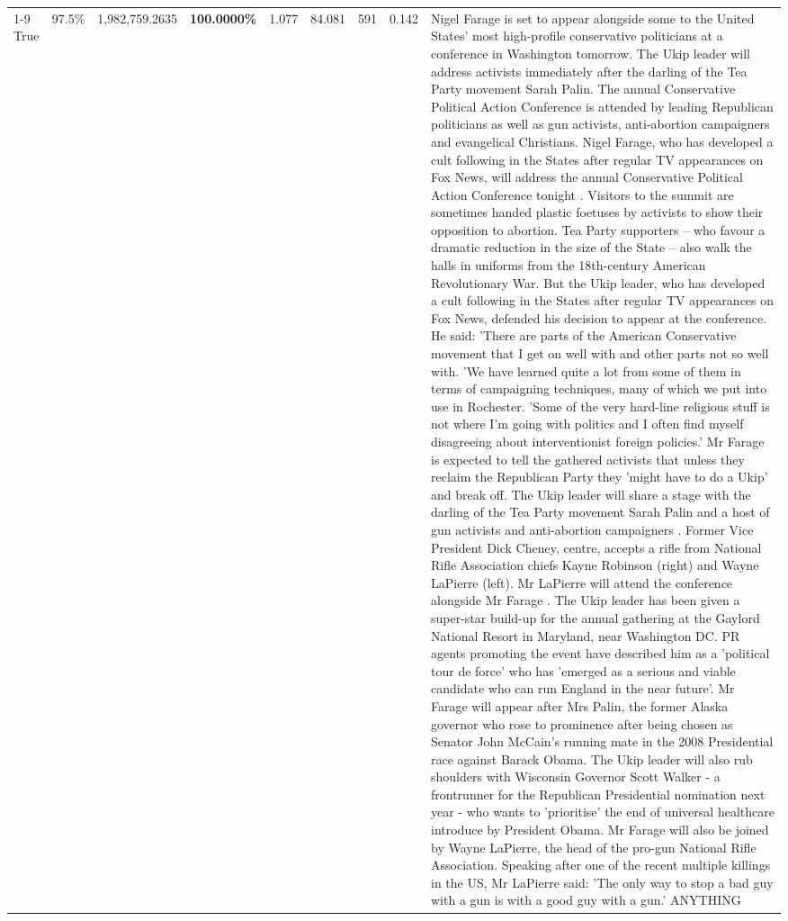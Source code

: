 \begin{table}[H]
\begin{tabular}{lllrlllll}
\cline{1-9} \cline{2-9}
True & 97.5\% & 1,982,759.2635 & \bfseries \color{red} 100.0000\% & 1.077 & 84.081 & 591 & 0.142 & Nigel Farage is set to appear alongside some to the United States' most high-profile conservative politicians at a conference in Washington tomorrow. The Ukip leader will address activists immediately after the darling of the Tea Party movement Sarah Palin. The annual Conservative Political Action Conference is attended by leading Republican politicians as well as gun activists, anti-abortion campaigners and evangelical Christians. Nigel Farage, who has developed a cult following in the States after regular TV appearances on Fox News, will address the annual Conservative Political Action Conference tonight . Visitors to the summit are sometimes handed plastic foetuses by activists to show their opposition to abortion. Tea Party supporters – who favour a dramatic reduction in the size of the State – also walk the halls in uniforms from the 18th-century American Revolutionary War. But the Ukip leader, who has developed a cult following in the States after regular TV appearances on Fox News, defended his decision to appear at the conference. He said: 'There are parts of the American Conservative movement that I get on well with and other parts not so well with. 'We have learned quite a lot from some of them in terms of campaigning techniques, many of which we put into use in Rochester. 'Some of the very hard-line religious stuff is not where I'm going with politics and I often find myself disagreeing about interventionist foreign policies.' Mr Farage is expected to tell the gathered activists that unless they reclaim the Republican Party they 'might have to do a Ukip' and break off. The Ukip leader will share a stage with the darling of the Tea Party movement Sarah Palin and a host of gun activists and anti-abortion campaigners . Former Vice President Dick Cheney, centre, accepts a rifle from National Rifle Association chiefs Kayne Robinson (right) and Wayne LaPierre (left). Mr LaPierre will attend the conference alongside Mr Farage . The Ukip leader has been given a super-star build-up for the annual gathering at the Gaylord National Resort in Maryland, near Washington DC. PR agents promoting the event have described him as a 'political tour de force' who has 'emerged as a serious and viable candidate who can run England in the near future'. Mr Farage will appear after Mrs Palin, the former Alaska governor who rose to prominence after being chosen as Senator John McCain's running mate in the 2008 Presidential race against Barack Obama. The Ukip leader will also rub shoulders with Wisconsin Governor Scott Walker - a frontrunner for the Republican Presidential nomination next year - who wants to 'prioritise' the end of universal healthcare introduce by President Obama. Mr Farage will also be joined by Wayne LaPierre, the head of the pro-gun National Rifle Association. Speaking after one of the recent multiple killings in the US, Mr LaPierre said: 'The only way to stop a bad guy with a gun is with a good guy with a gun.' ANYTHING \\

\end{tabular}
\end{table}
